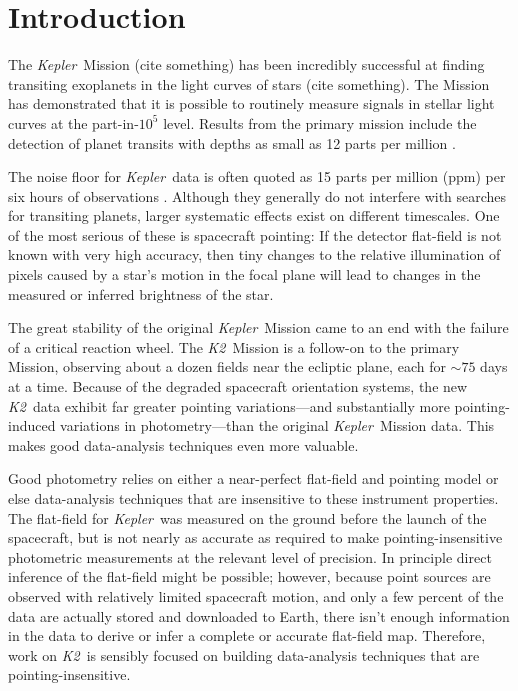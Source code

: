 \documentclass[12pt,preprint]{aastex}
\newcommand{\project}[1]{\textsl{#1}} %
\newcommand{\kepler}{\project{Kepler}}
\newcommand{\KT}{\project{K2}}
\begin{document}

\section{Introduction}

The \kepler\ Mission (cite something) has been incredibly successful at
finding transiting exoplanets in the light curves of stars (cite something).
The Mission has demonstrated that it is possible to routinely measure signals
in stellar light curves at the part-in-$10^5$ level.
Results from the primary mission include the detection of planet transits with
depths as small as 12 parts per million \citep{Barclay:2013}.

The noise floor for \kepler\ data is often quoted as 15 parts per million (ppm) per
six hours of observations \citep{Gilliland:2011}.
Although they generally do not interfere with searches for transiting
planets, larger systematic effects exist on different timescales.
One of the most serious of these is spacecraft pointing: If the detector
flat-field is not known with very high accuracy, then tiny changes to the relative
illumination of pixels caused by a star's motion in the focal plane will lead
to changes in the measured or inferred brightness of the star.

The great stability of the original \kepler\ Mission
came to an end with the failure of a critical reaction wheel.
The \KT\ Mission \citep{Howell:2014} is a follow-on to the primary Mission,
observing about a dozen fields near the ecliptic plane, each for
$\sim 75$ days at a time.
Because of the degraded spacecraft orientation systems, the new \KT\ data
exhibit far greater pointing variations---and substantially more
pointing-induced variations in photometry---than the original \kepler\ Mission data.
This makes good data-analysis techniques even more valuable.

Good photometry relies on either a near-perfect flat-field
and pointing model or else data-analysis techniques that are
insensitive to these instrument properties.
The flat-field for \kepler\ was measured on the ground before the launch of
the spacecraft, but is not nearly as accurate as required to make
pointing-insensitive photometric measurements at the relevant level of precision.
In principle direct inference of the flat-field might be possible;
however, because point sources are observed with relatively limited
spacecraft motion, and only a few percent of the data are actually stored and
downloaded to Earth, there isn't enough information in the data to derive or
infer a complete or accurate flat-field map.
Therefore, work on \KT\ is sensibly focused on building data-analysis
techniques that are pointing-insensitive.
\end{document}
